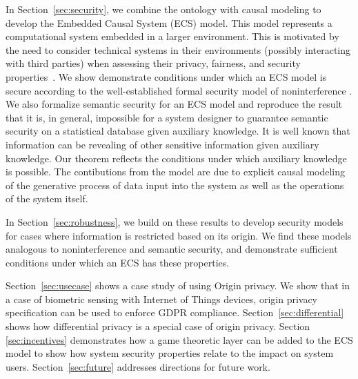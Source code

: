 \documentclass[../thesis.tex]{subfiles}
\begin{document}
In Section~\ref{sec:security}, we combine the
ontology with causal modeling to develop
the Embedded Causal System (ECS) model.
This model represents a computational system
embedded in a larger environment.
This is motivated by the need to consider technical
systems in their environments (possibly interacting
with third parties) when assessing their privacy,
fairness, and security properties~\cite{veale2017fairer}.
We show demonstrate conditions under which an ECS model
is secure according to the well-established formal security model
of noninterference \cite{gm82security}.
We also formalize semantic security for an ECS model
and reproduce the result that it is, in general, impossible
for a system designer to guarantee semantic security
on a statistical database given auxiliary knowledge.
It is well known that information
can be revealing of other sensitive information given
auxiliary knowledge. Our theorem reflects the conditions
under which auxiliary knowledge is possible.
The contibutions from the model are due to explicit
causal modeling of the generative process of data
input into the system as well as the operations
of the system itself.

In Section~\ref{sec:robustness}, we build on these results
to develop security models for cases where information
is restricted based on its origin.
We find these models analogous to noninterference
and semantic security, and demonstrate sufficient
conditions under which an ECS has these properties.

Section~\ref{sec:usecase} shows a case study of using Origin privacy.
We show that in a case of biometric sensing with
Internet of Things devices, origin privacy specification
can be used to enforce GDPR compliance.
Section~\ref{sec:differential} shows how differential privacy
is a special case of origin privacy.
Section \ref{sec:incentives} demonstrates how a game theoretic
layer can be added to the ECS model to show how system
security properties relate to the impact on system users.
Section~\ref{sec:future} addresses directions for future work.


%
\end{document}
